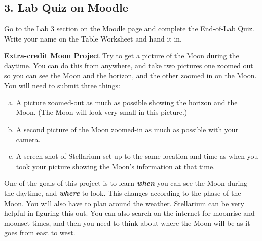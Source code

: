 \documentclass[main.tex]{subfiles}
\begin{document}
\subsection*{3. Lab Quiz on Moodle}
Go to the Lab 3 section on the Moodle page and complete the End-of-Lab Quiz. Write your name on the Table Worksheet and hand it in.

\textbf{Extra-credit Moon Project}
\newline
Try to get a picture of the Moon during the daytime. You can do this from anywhere, and take two pictures one zoomed out so you can see the Moon and the horizon, and the other zoomed in on the Moon. You will need to submit three things:
\begin{enumerate} [a.]
    \item A picture zoomed-out as much as possible showing the horizon and the Moon. (The Moon will look very small in this picture.)
    \item A second picture of the Moon zoomed-in as much as possible with your camera. 
    \item A screen-shot of Stellarium set up to the same location and time as when you took your picture showing the Moon's information at that time.
\end{enumerate}
One of the goals of this project is to learn \textit{\textbf{when}} you can see the Moon during the daytime, and \textbf{\textit{where}} to look. This changes according to the phase of the Moon. You will also have to plan around the weather. Stellarium can be very helpful in figuring this out. You can also search on the internet for moonrise and moonset times, and then you need to think about where the Moon will be as it goes from east to west.  
\end{document}
